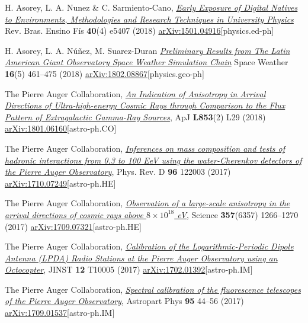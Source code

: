 \begin{etaremune}
\item {} H. Asorey, L. A. Nunez \& C. Sarmiento-Cano, \href{http://dx.doi.org/10.1590/1806-9126-rbef-2018-0092}{\emph{Early Exposure of Digital Natives to Environments, Methodologies and Research Techniques in University Physics}} Rev. Bras. Ensino Fís {\bf{40}}(4) e5407 (2018) \href{http://arxiv.org/abs/1501.04916}{arXiv:1501.04916}[physics.ed-ph]

\item {}H. Asorey, L. A. Núñez, M. Suarez-Duran \href{https://doi.org/10.1002/2017SW001774}{\emph{Preliminary Results from The Latin American Giant Observatory Space Weather Simulation Chain}} Space Weather {\bf{16}}(5) 461--475 (2018) \href{https://arxiv.org/abs/1802.08867}{arXiv:1802.08867}[physics.geo-ph]

\item {}The Pierre Auger Collaboration, \href{https://doi.org/10.3847/2041-8213/aaa66d}{\emph{An Indication of Anisotropy in Arrival Directions of Ultra-high-energy Cosmic Rays through Comparison to the Flux Pattern of Extragalactic Gamma-Ray Sources}}, ApJ {\bf{L853}}(2) L29 (2018) \href{https://arxiv.org/abs/1801.06160}{arXiv:1801.06160}[astro-ph.CO]
	
\item {}The Pierre Auger Collaboration, \href{https://doi.org/10.1103/PhysRevD.96.122003}{\emph{Inferences on mass composition and tests of hadronic interactions from 0.3 to 100 EeV using the water-Cherenkov detectors of the Pierre Auger Observatory}}, Phys. Rev. D {\bf{96}} 122003 (2017) \href{https://arxiv.org/abs/1710.07249}{arXiv:1710.07249}[astro-ph.HE]

\item {}The Pierre Auger Collaboration, \href{https://doi.org/10.1126/science.aan4338}{\emph{Observation of a large-scale anisotropy in the arrival directions of cosmic rays above $8\times 10^{18}$ eV}}, Science {\bf{357}}(6357) 1266--1270 (2017) \href{https://arxiv.org/abs/1709.07321}{arXiv:1709.07321}[astro-ph.HE]

\item {}The Pierre Auger Collaboration, \href{https://doi.org/10.1088/1748-0221/12/10/T10005}{\emph{Calibration of the Logarithmic-Periodic Dipole Antenna (LPDA) Radio Stations at the Pierre Auger Observatory using an Octocopter}}, JINST {\bf{12}} T10005 (2017) \href{http://arxiv.org/abs/1702.01392}{arXiv:1702.01392}[astro-ph.IM]

\item {}The Pierre Auger Collaboration, \href{https://doi.org/10.1016/j.astropartphys.2017.09.001}{\emph{Spectral calibration of the fluorescence telescopes of the Pierre Auger Observatory}}, Astropart Phys {\bf{95}} 44--56 (2017) \href{https://arxiv.org/abs/1709.01537}{arXiv:1709.01537}[astro-ph.IM]


\end{etaremune}
